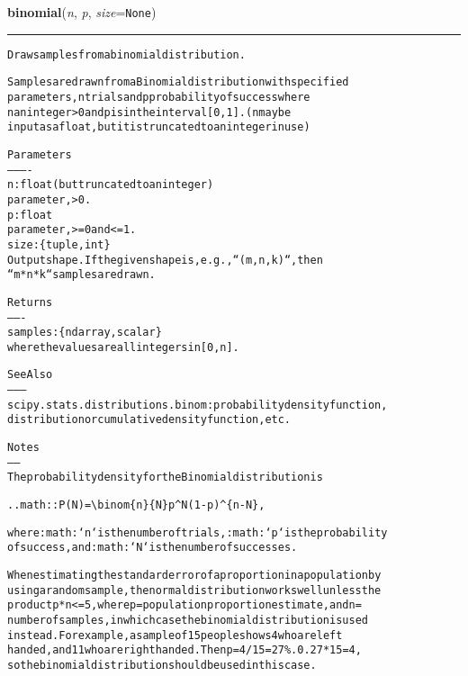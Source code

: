     \label{trunk:qstkutil:bollinger:binomial}

    \vspace{0.5ex}

\hspace{.8\funcindent}\begin{boxedminipage}{\funcwidth}

    \raggedright \textbf{binomial}(\textit{n}, \textit{p}, \textit{size}={\tt None})

    \vspace{-1.5ex}

    \rule{\textwidth}{0.5\fboxrule}
\setlength{\parskip}{2ex}
\begin{alltt}
Draw samples from a binomial distribution.

Samples are drawn from a Binomial distribution with specified
parameters, n trials and p probability of success where
n an integer {\textgreater} 0 and p is in the interval [0,1]. (n may be
input as a float, but it is truncated to an integer in use)

Parameters
----------
n : float (but truncated to an integer)
        parameter, {\textgreater} 0.
p : float
        parameter, {\textgreater}= 0 and {\textless}=1.
size : \{tuple, int\}
    Output shape.  If the given shape is, e.g., ``(m, n, k)``, then
    ``m * n * k`` samples are drawn.

Returns
-------
samples : \{ndarray, scalar\}
          where the values are all integers in  [0, n].

See Also
--------
scipy.stats.distributions.binom : probability density function,
    distribution or cumulative density function, etc.

Notes
-----
The probability density for the Binomial distribution is

.. math:: P(N) = {\textbackslash}binom\{n\}\{N\}p{\textasciicircum}N(1-p){\textasciicircum}\{n-N\},

where :math:`n` is the number of trials, :math:`p` is the probability
of success, and :math:`N` is the number of successes.

When estimating the standard error of a proportion in a population by
using a random sample, the normal distribution works well unless the
product p*n {\textless}=5, where p = population proportion estimate, and n =
number of samples, in which case the binomial distribution is used
instead. For example, a sample of 15 people shows 4 who are left
handed, and 11 who are right handed. Then p = 4/15 = 27\%. 0.27*15 = 4,
so the binomial distribution should be used in this case.


\end{alltt}
\end{boxedminipage}
